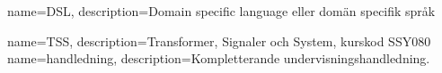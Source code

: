 {
    name=DSL,
    description={Domain specific language eller domän specifik språk}
}

{
    name=TSS,
    description={Transformer, Signaler och System, kurskod SSY080}
}
{
	name=handledning,
	description={Kompletterande undervisningshandledning.}
}

